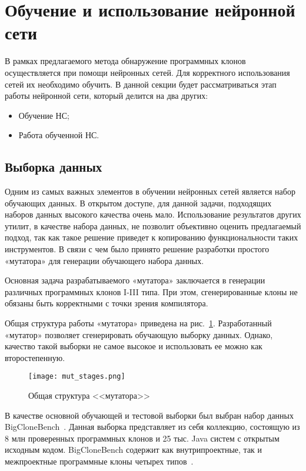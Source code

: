 \section{Обучение и использование нейронной сети}

В рамках предлагаемого метода обнаружение программных клонов осуществляется при помощи нейронных сетей. Для корректного использования сетей их необходимо обучить. В данной секции будет рассматриваться этап работы нейронной сети, который делится на два других:

\begin{itemize}
\setlength\itemsep{0mm}
\item Обучение НС;
\item Работа обученной НС.
\end{itemize}

\subsection{Выборка данных}

Одним из самых важных элементов в обучении нейронных сетей является набор обучающих данных. В открытом доступе, для данной задачи, подходящих наборов данных высокого качества очень мало. Использование результатов других утилит, в качестве набора данных, не позволит объективно оценить предлагаемый подход, так как такое решение приведет к копированию функциональности таких инструментов. В связи с чем было принято решение разработки простого «мутатора» для генерации обучающего набора данных.

Основная задача разрабатываемого «мутатора» заключается в генерации различных программных клонов I-III типа. При этом, сгенерированные клоны не обязаны быть корректными с точки зрения компилятора.

Общая структура работы «мутатора» приведена на рис.~\ref{fig:mut_stages}. Разработанный «мутатор» позволяет сгенерировать обучающую выборку данных. Однако, качество такой выборки не самое высокое и использовать ее можно как второстепенную.

\begin{figure}[htbp]
\centering
\texttt{[image: mut\_stages.png]}
\caption{Общая структура <<мутатора>>}
\label{fig:mut_stages}
\end{figure}

В качестве основной обучающей и тестовой выборки был выбран набор данных BigCloneBench~\cite{bcb}. Данная выборка представляет из себя коллекцию, состоящую из 8 млн проверенных программных клонов и 25 тыс. Java систем с открытым исходным кодом. BigCloneBench содержит как внутрипроектные, так и межпроектные программные клоны четырех типов~\cite{bcb}.

